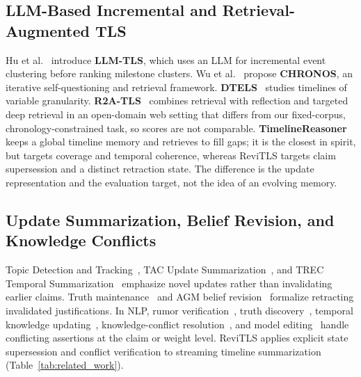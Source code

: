 \documentclass[journal]{IEEEtran}
\begin{document}
\subsection{LLM-Based Incremental and Retrieval-Augmented TLS}
Hu et al.~\cite{hu2024moments} introduce \textbf{LLM-TLS}, which uses an LLM for incremental event clustering before ranking milestone clusters. Wu et al.~\cite{wu2025unfolding} propose \textbf{CHRONOS}, an iterative self-questioning and retrieval framework. \textbf{DTELS}~\cite{dtels2025} studies timelines of variable granularity. \textbf{R2A-TLS}~\cite{bao2025r2atls} combines retrieval with reflection and targeted deep retrieval in an open-domain web setting that differs from our fixed-corpus, chronology-constrained task, so scores are not comparable. \textbf{TimelineReasoner}~\cite{zhang2026timelinereasoner} keeps a global timeline memory and retrieves to fill gaps; it is the closest in spirit, but targets coverage and temporal coherence, whereas ReviTLS targets claim supersession and a distinct retraction state. The difference is the update representation and the evaluation target, not the idea of an evolving memory.

\subsection{Update Summarization, Belief Revision, and Knowledge Conflicts}
Topic Detection and Tracking~\cite{allan2002topic}, TAC Update Summarization~\cite{dang2008overview}, and TREC Temporal Summarization~\cite{aslam2013trec, kedzie2015predicting} emphasize novel updates rather than invalidating earlier claims. Truth maintenance~\cite{doyle1979truth} and AGM belief revision~\cite{alchourron1985logic} formalize retracting invalidated justifications. In NLP, rumor verification~\cite{zubiaga2016analysing, kochkina2018all, thorne2018fever}, truth discovery~\cite{li2016survey}, temporal knowledge updating~\cite{dhingra2022time, kasai2023realtime}, knowledge-conflict resolution~\cite{xu2024knowledge}, and model editing~\cite{meng2022locating, mitchell2022fast} handle conflicting assertions at the claim or weight level. ReviTLS applies explicit state supersession and conflict verification to streaming timeline summarization (Table~\ref{tab:related_work}).
\end{document}
